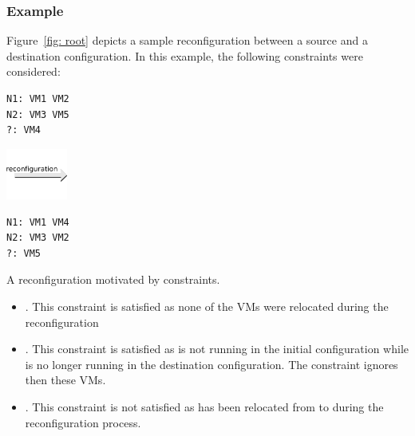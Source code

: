 \subsubsection{Example}

Figure~\ref{fig: root} depicts a sample reconfiguration between a source and a destination configuration. In this example, the following  constraints were considered:

\begin{reconfiguration}
\centering
\begin{minipage}[b]{0.40\textwidth}
\begin{lstlisting}
N1: VM1 VM2
N2: VM3 VM5
?: VM4
\end{lstlisting}
\end{minipage}
\begin{minipage}[b]{2cm}
\includegraphics[width=2cm]{img/arrow_reconfiguration}
\end{minipage}
\begin{minipage}[b]{0.40\textwidth}
\begin{lstlisting}
N1: VM1 VM4
N2: VM3 VM2
?: VM5
\end{lstlisting}
\end{minipage}
\caption{A reconfiguration motivated by  constraints.}\label{fig: root}
\end{reconfiguration}

\begin{itemize}
\item {}. This constraint is satisfied as none of the VMs were relocated during the reconfiguration
\item {}. This constraint is satisfied as  is not running in the initial configuration while  is no longer running in the destination configuration. The constraint ignores then these VMs.
\item {}. This constraint is not satisfied as  has been relocated from  to  during the reconfiguration process.
\end{itemize}



